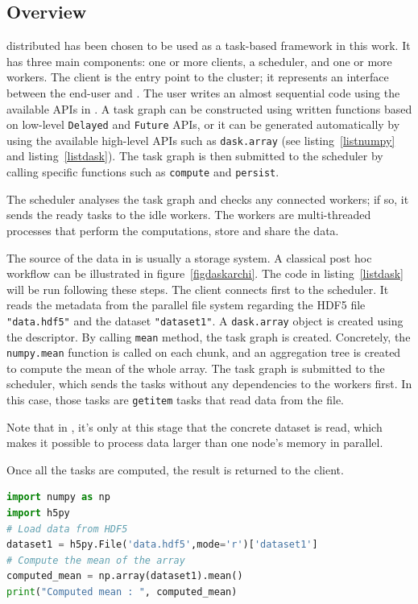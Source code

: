 \subsection{Overview}
\dask distributed has been chosen to be used as a task-based framework in this work.  
It has three main components: one or more clients, a scheduler, and one or more workers. The client is the entry point to the \dask cluster; it represents an interface between the end-user and \dask. 
The user writes an almost sequential code using the available APIs in \dask. A task graph can be constructed using written functions based on low-level \texttt{Delayed} and \texttt{Future} APIs, or it can be generated automatically by using the available high-level APIs such as \texttt{dask.array} (see listing~\ref{listnumpy} and listing~\ref{listdask}). The task graph is then submitted to the scheduler by calling specific functions such as \texttt{compute} and \texttt{persist}.    

The scheduler analyses the task graph and checks any connected workers; if so, it sends the ready tasks to the idle workers. The workers are multi-threaded processes that perform the computations, store and share the data. 

The source of the data in \dask is usually a storage system. A classical post hoc workflow can be illustrated in figure~\ref{figdaskarchi}. The code in listing~\ref{listdask} will be run following these steps. The client connects first to the scheduler. It reads the metadata from the parallel file system regarding the HDF5 file \texttt{"data.hdf5"} and the dataset \texttt{"dataset1"}. A \texttt{dask.array} object is created using the descriptor. By calling \texttt{mean} method, the task graph is created. Concretely, the \texttt{numpy.mean} function is called on each chunk, and an aggregation tree is created to compute the mean of the whole array. The task graph is submitted to the scheduler, which sends the tasks without any dependencies to the workers first. In this case, those tasks are \texttt{getitem} tasks that read data from the file. 

Note that in \dask, it's only at this stage that the concrete dataset is read, which makes it possible to process data larger than one node's memory in parallel.

Once all the tasks are computed, the result is returned to the client.

\begin{lstlisting}[float, label=listnumpy, language=python, caption=Sequential post hoc mean using numpy]
import numpy as np
import h5py
# Load data from HDF5
dataset1 = h5py.File('data.hdf5',mode='r')['dataset1']
# Compute the mean of the array
computed_mean = np.array(dataset1).mean()
print("Computed mean : ", computed_mean)
\end{lstlisting}

